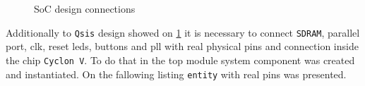 \begin{figure}[H]
	\begin{center}
	\end{center}
	\caption{SoC design connections}
	\label{fig:soc_system}
\end{figure}

Additionally to \verb|Qsis| design showed on \figurename{} \ref{fig:soc_system} it is necessary to connect \verb|SDRAM|, parallel port, clk, reset leds, buttons and pll with real physical pins and connection inside the chip \verb|Cyclon V|. To do that in the top module system component was created and instantiated. On the fallowing listing \verb|entity| with real pins was presented.

